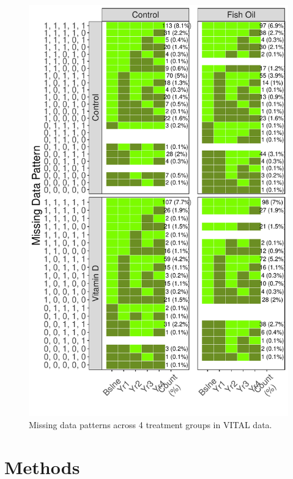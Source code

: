 \documentclass{article}
\begin{document}
\begin{figure}

{\centering \includegraphics{Final_Report_files/figure-latex/unnamed-chunk-23-1} 

}

\caption{Missing data patterns across 4 treatment groups in VITAL data.}\label{fig:unnamed-chunk-23}
\end{figure}

\newpage

\section{Methods}\label{methods}
\end{document}
